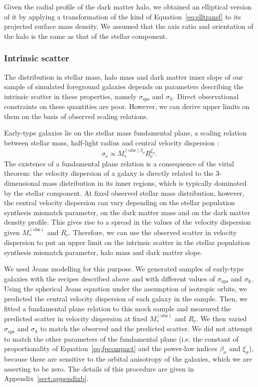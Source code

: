 \documentclass{aa}
\def\reff{R_{\mathrm{e}}}
\def\mstar{M_*}
\def\mobs{M_*^{(\mathrm{obs})}}
\def\Eref#1{Equation~\ref{#1}\xspace}
\begin{document}
Given the radial profile of the dark matter halo, we obtained an elliptical version of it by applying a transformation of the kind of \Eref{eq:elltransf} to its projected surface mass density.
We assumed that the axis ratio and orientation of the halo is the same as that of the stellar component.

\subsubsection{Intrinsic scatter}\label{ssub:scat}

The distribution in stellar mass, halo mass and dark matter inner slope of our sample of simulated foreground galaxies depends on parameters describing the intrinsic scatter in these properties, namely $\sigma_{\mathrm{sps}}$ and $\sigma_h$.
Direct observational constraints on these quantities are poor.
However, we can derive upper limits on them on the basis of observed scaling relations.

Early-type galaxies lie on the stellar mass fundamental plane, a scaling relation between stellar mass, half-light radius and central velocity dispersion \citep{H+B09}:
\begin{equation}\label{eq:fpcompact}
\sigma_{\mathrm{e}} \propto \mstar^{(\mathrm{obs})\beta_{\sigma}}\reff^{\xi_{\sigma}}.
\end{equation}
The existence of a fundamental plane relation is a consequence of the virial theorem: the velocity dispersion of a galaxy is directly related to the 3-dimensional mass distribution in its inner regions, which is typically dominated by the stellar component.
At fixed observed stellar mass distribution, however, the central velocity dispersion can vary depending on the stellar population synthesis mismatch parameter, on the dark matter mass and on the dark matter density profile. This gives rise to a spread in the values of the velocity dispersion given $\mobs$ and $\reff$.
Therefore, we can use the observed scatter in velocity dispersion to put an upper limit on the intrinsic scatter in the stellar population synthesis mismatch parameter, halo mass and dark matter slope.

We used Jeans modelling for this purpose.
We generated samples of early-type galaxies with the recipes described above and with different values of $\sigma_{\mathrm{sps}}$ and $\sigma_\mathrm{h}$.
Using the spherical Jeans equation under the assumption of isotropic orbits, we predicted the central velocity dispersion of each galaxy in the sample. Then, we fitted a fundamental plane relation to this mock sample and measured the predicted scatter in velocity dispersion at fixed $\mobs$ and $\reff$.
We then varied $\sigma_{\mathrm{sps}}$ and $\sigma_h$ to match the observed and the predicted scatter.
We did not attempt to match the other parameters of the fundamental plane (i.e. the constant of proportionality of \Eref{eq:fpcompact} and the power-law indices $\beta_{\sigma}$ and $\xi_{\sigma}$), because these are sensitive to the orbital anisotropy of the galaxies, which we are asserting to be zero.
The details of this procedure are given in Appendix~\ref{sect:appendixb}.
\end{document}
